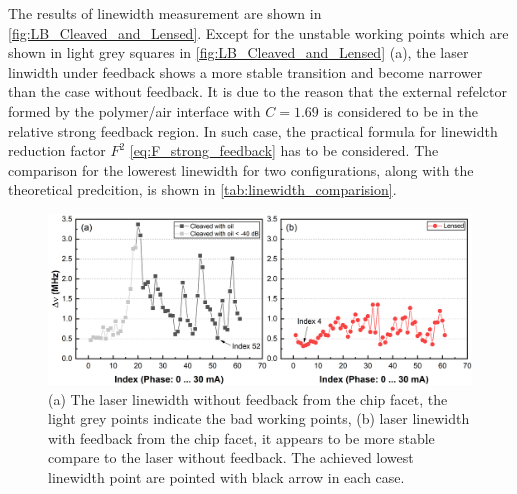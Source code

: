 The results of linewidth measurement are shown in \autoref{fig:LB_Cleaved_and_Lensed}. Except for the unstable working points which are shown in light grey squares in \autoref{fig:LB_Cleaved_and_Lensed} (a), the laser linwidth under feedback shows a more stable transition and become narrower than the case without feedback. It is due to the reason that the external refelctor formed by the polymer/air interface with $C=1.69$ is considered to be in the relative strong feedback region. In such case, the practical formula for linewidth reduction factor $F^2$ \autoref{eq:F_strong_feedback} has to be considered. The comparison for the lowerest linewidth for two configurations, along with the theoretical predcition, is shown in \autoref{tab:linewidth_comparision}.

\begin{figure}[ht]
    \centering
    \includegraphics[width=\linewidth]{figures/LB_Cleaved_and_Lensed.png}
    \caption{(a) The laser linewidth without feedback from the chip facet, the light grey points indicate the bad working points, (b) laser linewidth with feedback from the chip facet, it appears to be more stable compare to the laser without feedback. The achieved lowest linewidth point are pointed with black arrow in each case.}
    \label{fig:LB_Cleaved_and_Lensed}
\end{figure}


